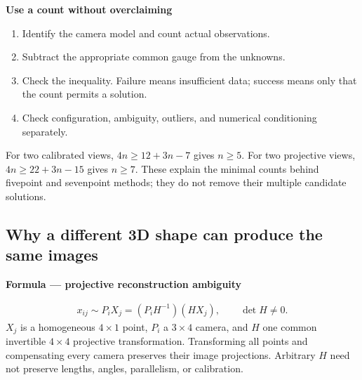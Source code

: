 \documentclass[letterpaper,11pt,english,openany,oneside]{jupyterBook}
\begin{document}
\begin{TextbookBox}
\textbf{Use a count without overclaiming}\par\smallskip
\begin{enumerate}
%
\item {}
\sphinxAtStartPar
Identify the camera model and count actual observations.

\item {}
\sphinxAtStartPar
Subtract the appropriate common gauge from the unknowns.

\item {}
\sphinxAtStartPar
Check the inequality. Failure means insufficient data; success means only that the count permits a solution.

\item {}
\sphinxAtStartPar
Check configuration, ambiguity, outliers, and numerical conditioning separately.

\end{enumerate}

\end{TextbookBox}

\sphinxAtStartPar
For two calibrated views, \(4n\ge12+3n-7\) gives \(n\ge5\). For two projective views, \(4n\ge22+3n-15\) gives \(n\ge7\). These explain the minimal counts behind five\sphinxhyphen{}point and seven\sphinxhyphen{}point methods; they do not remove their multiple candidate solutions.


\subsection{Why a different 3D shape can produce the same images}
\label{\detokenize{lectures/lecture06/ambiguity:why-a-different-3d-shape-can-produce-the-same-images}}
\begin{TextbookBox}
\textbf{Formula — projective reconstruction ambiguity}\par\smallskip
\begin{equation}\label{equation:lectures/lecture06/ambiguity:eq-lec06-gauge}
\begin{split}x_{ij}\sim P_iX_j
=(P_iH^{-1})(HX_j),\qquad \det H\ne0.\end{split}
\end{equation}
\sphinxAtStartPar
\(X_j\) is a homogeneous \(4\times1\) point, \(P_i\) a \(3\times4\) camera, and \(H\) one common invertible \(4\times4\) projective transformation. Transforming all points and compensating every camera preserves their image projections. Arbitrary \(H\) need not preserve lengths, angles, parallelism, or calibration.

\end{TextbookBox}
\end{document}
